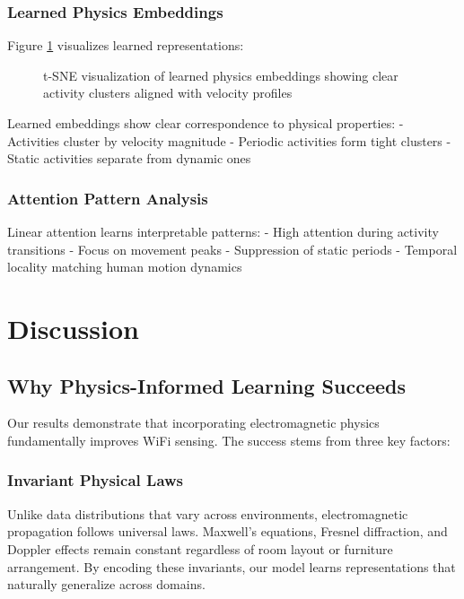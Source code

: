 \documentclass[10pt,journal,compsoc]{IEEEtran}
\begin{document}
\subsubsection{Learned Physics Embeddings}

Figure \ref{fig:physics_embeddings} visualizes learned representations:

\begin{figure}[h]
\centering
\framebox[0.45\textwidth]{\rule{0pt}{3cm}}
\caption{t-SNE visualization of learned physics embeddings showing clear activity clusters aligned with velocity profiles}
\label{fig:physics_embeddings}
\end{figure}

Learned embeddings show clear correspondence to physical properties:
- Activities cluster by velocity magnitude
- Periodic activities form tight clusters
- Static activities separate from dynamic ones

\subsubsection{Attention Pattern Analysis}

Linear attention learns interpretable patterns:
- High attention during activity transitions
- Focus on movement peaks
- Suppression of static periods
- Temporal locality matching human motion dynamics

\section{Discussion}
\label{sec:discussion}

\subsection{Why Physics-Informed Learning Succeeds}

Our results demonstrate that incorporating electromagnetic physics fundamentally improves WiFi sensing. The success stems from three key factors:

\subsubsection{Invariant Physical Laws}
Unlike data distributions that vary across environments, electromagnetic propagation follows universal laws. Maxwell's equations, Fresnel diffraction, and Doppler effects remain constant regardless of room layout or furniture arrangement. By encoding these invariants, our model learns representations that naturally generalize across domains.
\end{document}

